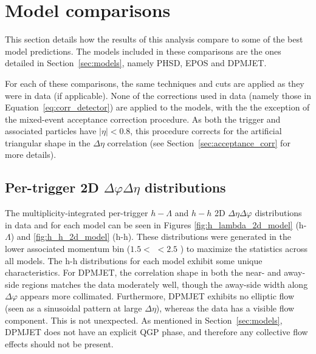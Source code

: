 \section{Model comparisons}
\label{sec:model_comparisons}
This section details how the results of this analysis compare to some of the best \pPb model predictions. The models included in these comparisons are the ones detailed in Section~\ref{sec:models}, namely PHSD, EPOS and DPMJET.

For each of these comparisons, the same techniques and cuts are applied as they were in data (if applicable).  None of the corrections used in data (namely those in Equation~\ref{eq:corr_detector}) are applied to the models, with the the exception of the mixed-event acceptance correction procedure. As both the trigger and associated particles have $|\eta| < 0.8$, this procedure corrects for the artificial triangular shape in the $\Delta\eta$ correlation (see Section~\ref{sec:acceptance_corr} for more details).

\subsection{Per-trigger 2D $\Delta\varphi\Delta\eta$ distributions}
\label{sec:model_2d_correlations}

The multiplicity-integrated per-trigger $h-\Lambda$ and $h-h$ 2D $\Delta\eta\Delta\varphi$ distributions in data and for each model can be seen in Figures \ref{fig:h_lambda_2d_model} (h-$\Lambda$) and \ref{fig:h_h_2d_model} (h-h). These distributions were generated in the lower associated momentum bin ($1.5 <$ \pt $< 2.5$ \GeVc) to maximize the statistics across all models. The h-h distributions for each model exhibit some unique characteristics. For DPMJET, the correlation shape in both the near- and away-side regions matches the data moderately well, though the away-side width along $\Delta\varphi$ appears more collimated. Furthermore, DPMJET exhibits no elliptic flow (seen as a sinusoidal pattern at large $\Delta\eta$), whereas the data has a visible flow component. This is not unexpected. As mentioned in Section~\ref{sec:models}, DPMJET does not have an explicit QGP phase, and therefore any collective flow effects should not be present. 

